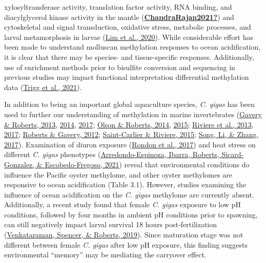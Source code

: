 \documentclass [11pt, proquest] {uwthesis}[2015/03/03]
\begin{document}
xylosyltransferase activity, translation factor activity, RNA binding, and diacylglycerol kinase activity in the mantle (\protect\hyperlink{ref-ChandraRajan2021}{\textbf{ChandraRajan2021?}}) and cytoskeletal and signal transduction, oxidative stress, metabolic processes, and larval metamorphosis in larvae (\protect\hyperlink{ref-Lim2020}{Lim et al., 2020}). While considerable effort has been made to understand molluscan methylation responses to ocean acidification, it is clear that there may be species- and tissue-specific responses. Additionally, use of enrichment methods prior to bisulfite conversion and sequencing in previous studies may impact functional interpretation differential methylation data (\protect\hyperlink{ref-Trigg2021}{Trigg et al., 2021}).

In addition to being an important global aquaculture species, \emph{C. gigas} has been used to further our understanding of methylation in marine invertebrates (\protect\hyperlink{ref-Gavery2013}{Gavery \& Roberts, 2013}, \protect\hyperlink{ref-Gavery2014}{2014}, \protect\hyperlink{ref-Gavery2017}{2017}; \protect\hyperlink{ref-Olson2014}{Olson \& Roberts, 2014}, \protect\hyperlink{ref-Olson2015}{2015}; \protect\hyperlink{ref-Riviere2013}{Riviere et al., 2013}, \protect\hyperlink{ref-Riviere2017}{2017}; \protect\hyperlink{ref-Roberts2012}{Roberts \& Gavery, 2012}; \protect\hyperlink{ref-Saint-Carlier2015}{Saint-Carlier \& Riviere, 2015}; \protect\hyperlink{ref-Song2017}{Song, Li, \& Zhang, 2017}). Examination of diuron exposure (\protect\hyperlink{ref-Rondon2017}{Rondon et al., 2017}) and heat stress on different \emph{C. gigas} phenotypes (\protect\hyperlink{ref-Arredondo-Espinoza2021}{Arredondo-Espinoza, Ibarra, Roberts, Sicard-Gonzalez, \& Escobedo-Fregoso, 2021}) reveal that environmental conditions do influence the Pacific oyster methylome, and other oyster methylomes are responsive to ocean acidification (Table 3.1). However, studies examining the influence of ocean acidification on the \emph{C. gigas} methylome are currently absent. Additionally, a recent study found that female \emph{C. gigas} exposure to low pH conditions, followed by four months in ambient pH conditions prior to spawning, can still negatively impact larval survival 18 hours post-fertilization (\protect\hyperlink{ref-Venkataraman2019}{Venkataraman, Spencer, \& Roberts, 2019}). Since maturation stage was not different between female \emph{C. gigas} after low pH exposure, this finding suggests environmental ``memory'' may be mediating the carryover effect.
\end{document}
